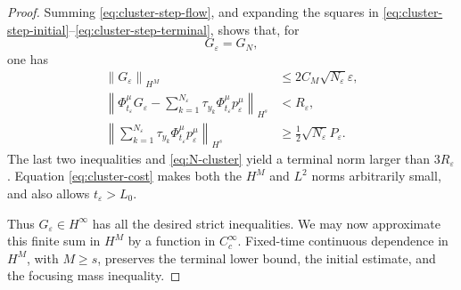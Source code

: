 \documentclass[10pt,a4paper]{amsart}
\numberwithin{equation}{section}
\newcommand{\eps}{\varepsilon}
\newcommand{\norm}[1]{\left\lVert #1\right\rVert}
\newcommand{\flow}[1]{\Phi^{#1}}
\newcommand{\trans}[1]{\tau_{#1}}
\begin{document}
\begin{proof}
Summing \eqref{eq:cluster-step-flow}, and expanding the squares in
\eqref{eq:cluster-step-initial}--\eqref{eq:cluster-step-terminal}, shows that,
for
\begin{equation}\label{eq:G-cluster}
 G_\eps=G_N,
\end{equation}
one has
\begin{align}
 \norm{G_\eps}_{H^M}
 &\leq2C_M\sqrt{N_\eps}\eps,
 \label{eq:G-small}\\
 \norm{\flow\mu_{t_\eps}G_\eps-
 \sum_{k=1}^{N_\eps}\trans{y_k}
 \flow\mu_{t_\eps}p_\eps^\mu}_{H^s}
 &<R_\eps,\label{eq:G-flow-error}\\
 \norm{\sum_{k=1}^{N_\eps}\trans{y_k}
 \flow\mu_{t_\eps}p_\eps^\mu}_{H^s}
 &\geq\frac12\sqrt{N_\eps}P_\eps.
 \label{eq:G-output-orthog}
\end{align}
The last two inequalities and \eqref{eq:N-cluster} yield a terminal norm
larger than $3R_\eps$.  Equation \eqref{eq:cluster-cost} makes both the
$H^M$ and $L^2$ norms arbitrarily small, and also allows $t_\eps>L_0$.

Thus $G_\eps\in H^\infty$ has all the desired strict inequalities.  We may
now approximate this finite sum in $H^M$ by a function in $C_c^\infty$.
Fixed-time continuous dependence in $H^M$, with $M\geq s$, preserves the
terminal lower bound, the initial estimate, and the focusing mass inequality.
\end{proof}
\end{document}
